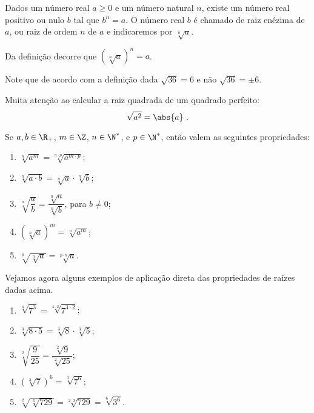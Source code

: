 \vskip0.3cm

 \colorbox{azul}{
 \begin{minipage}{0.9\linewidth}
 \begin{center}
  Dados um número real $a \geq 0$ e um número natural $n$, existe um número real positivo ou nulo $b$ tal que $b^n= a$. O número real $b$ é chamado de raiz enézima de $a$, ou raiz de ordem $n$ de $a$ e indicaremos por $\sqrt[n]{a}$.
 \end{center}
 \end{minipage}}

 \vskip0.3cm

 \begin{obs}
 Da definição decorre que $(\sqrt[n]{a})^n=a$.
 \end{obs}

 \begin{obs}
 Note que de acordo com a definição dada $\sqrt{36}= 6$ e não $\sqrt{36}= \pm 6$.
 \end{obs}

 \begin{obs}
 Muita atenção ao calcular a raiz quadrada de um quadrado perfeito:
\begin{equation}
\sqrt{a^2}= \abs{a} \ . 
\end{equation}
 \end{obs}

 Se $a, b \in \R_{+}$, $m \in \Z$, $n \in \N^{*}$, e $p \in \N^{*}$, então valem as seguintes propriedades:
 \begin{enumerate}[R1)]
 \item $\sqrt[n]{a^m}= \sqrt[n \cdot p]{a^{m\cdot p}}$;
 \item $\sqrt[n]{a \cdot b}= \sqrt[n]{a} \cdot \sqrt[n]{b}$;
 \item $\sqrt[n]{\dfrac{a}{b}}= \dfrac{\sqrt[n]{a}}{\sqrt[n]{b}}$, para $b \neq 0$;
 \item $(\sqrt[n]{a})^m= \sqrt[n]{a^m}$;
 \item $\sqrt[p]{\sqrt[n]{a}}= \sqrt[p \cdot n]{a}$.
 \end{enumerate}

 \begin{exem} Vejamos agora alguns exemplos de aplicação direta das propriedades de raízes dadas acima.
  \begin{enumerate}[R1)]
   \item $\sqrt[4]{7^3}= \sqrt[4 \cdot 2]{7^{3\cdot 2}}$;
 \item $\sqrt[3]{8 \cdot 5}= \sqrt[3]{8} \cdot \sqrt[3]{5}$;
 \item $\sqrt[2]{\dfrac{9}{25}}= \dfrac{\sqrt[2]{9}}{\sqrt[2]{25}}$;
 \item $\left(\sqrt[3]{7}\right)^6= \sqrt[3]{7^6}$;
 \item $\sqrt[2]{\sqrt[3]{729}}= \sqrt[2 \cdot 3]{729}= \sqrt[6]{3^6}$.
  \end{enumerate}

 \end{exem}


